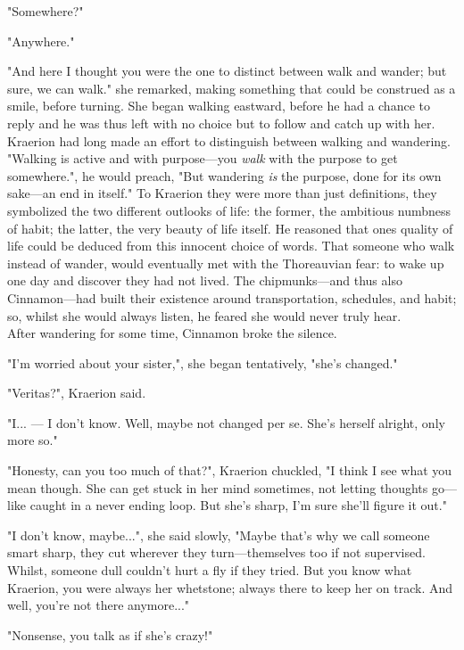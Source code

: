 "Somewhere?"

"Anywhere."

"And here I thought you were the one to distinct between walk and wander; but sure, we can walk." she remarked, making something that could be construed as a smile, before turning. She began walking eastward, before he had a chance to reply and he was thus left with no choice but to follow and catch up with her.\\

Kraerion had long made an effort to distinguish between walking and wandering. "Walking is active and with purpose---you \textit{walk} with the purpose to get somewhere.", he would preach, "But wandering \textit{is} the purpose, done for its own sake---an end in itself." To Kraerion they were more than just definitions, they symbolized the two different outlooks of life: the former, the ambitious numbness of habit; the latter, the very beauty of life itself. He reasoned that ones quality of life could be deduced from this innocent choice of words. That someone who walk instead of wander, would eventually met with the Thoreauvian fear: to wake up one day and discover they had not lived. The chipmunks---and thus also Cinnamon---had built their existence around transportation, schedules, and habit; so, whilst she would always listen, he feared she would never truly hear.\\

After wandering for some time, Cinnamon broke the silence. 

"I'm worried about your sister,", she began tentatively, "she's changed."

"Veritas?", Kraerion said.

"I... --- I don't know. Well, maybe not changed per se. She's herself alright, only more so."

"Honesty, can you too much of that?", Kraerion chuckled, "I think I see what you mean though. She can get stuck in her mind sometimes, not letting thoughts go---like caught in a never ending loop. But she's sharp, I'm sure she'll figure it out."

"I don't know, maybe...", she said slowly, "Maybe that's why we call someone smart sharp, they cut wherever they turn---themselves too if not supervised. Whilst, someone dull couldn't hurt a fly if they tried. But you know what Kraerion, you were always her whetstone; always there to keep her on track. And well, you're not there anymore..."

"Nonsense, you talk as if she's crazy!"

